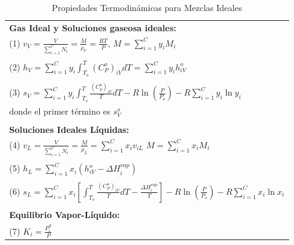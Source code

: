 \documentclass[11pt]{book}
\begin{document}
\begin{table}
\centering
\caption{Propiedades Termodinámicas para Mezclas Ideales}
\label{table:1}
\begin{tabular}{l} 
 \hline
\textbf{Gas Ideal y Soluciones gaseosa ideales:} \\

(1) $v_V = \frac{V}{\sum_{i = 1}^{C} N_i} = \frac{M}{\rho_V} = \frac{RT}{P}$, \hspace{0.75cm} $M = \sum_{i = 1}^{C} y_i M_i$ \\

\\

(2) $h_V = \sum_{i = 1}^{C} y_i \int_{T_o}^{T} (C_P^o)_{iV} dT = \sum_{i = 1}^{C} y_i h_{iV}^o$ \\

\\

(3) $s_V = \sum_{i = 1}^{C} y_i \int_{T_o}^{T} \frac{(C_p^o)_{iV}}{T}dT -R \ln \left( \frac{P}{P_o} \right) - R \sum_{i = 1}^{C} y_i \ln y_i$ \\

donde el primer término es $s_V^o$ \\

\\

\textbf{Soluciones Ideales Líquidas:} \\

(4) $v_L = \frac{V}{\sum_{i = 1}^{C} N_i} = \frac{M}{\rho_L} = \sum_{i = 1}^{C} x_i v_{iL}$ \hspace{0.75cm} $M = \sum_{i = 1}^{C} x_i M_i$ \\

\\

(5) $h_L = \sum_{i = 1}^{C} x_i \left( h_{iV}^o - \Delta H_i^{vap} \right)$ \\

\\

(6) $s_L = \sum_{i = 1}^{C} x_i \left[ \int_{T_o}^{T} \frac{(C_P^o)_{iV}}{T} dT - \frac{\Delta H_i^{vap}}{T} \right] - R \ln \left( \frac{P}{P_o} \right) - R \sum_{i = 1}^{C} x_i \ln x_i $ \\

\\

\textbf{Equilibrio Vapor-Líquido:} \\

(7) $K_i = \frac{P_i^S}{P}$

\end{tabular}
\end{table}
\end{document}
